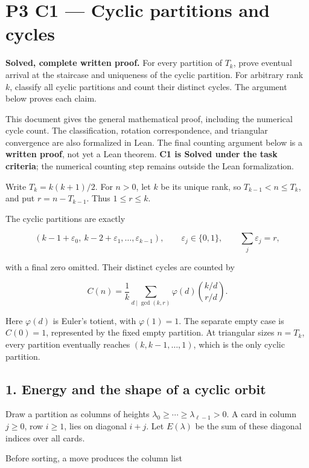 \documentclass[11pt,a4paper]{article}
\begin{document}
\section{P3 C1 --- Cyclic partitions and cycles}\label{p3-c1-cyclic-partitions-and-cycles}

\textbf{Solved, complete written proof.} For every partition of \(T_k\), prove eventual arrival at the staircase and uniqueness of the cyclic partition. For arbitrary rank \(k\), classify all cyclic partitions and count their distinct cycles. The argument below proves each claim.

This document gives the general mathematical proof, including the numerical cycle count. The classification, rotation correspondence, and triangular convergence are also formalized in Lean. The final counting argument below is a \textbf{written proof}, not yet a Lean theorem. \textbf{C1 is Solved under the task criteria}; the numerical counting step remains outside the Lean formalization.

Write \(T_k=k(k+1)/2\). For \(n>0\), let \(k\) be its unique rank, so \(T_{k-1}<n\le T_k\), and put \(r=n-T_{k-1}\). Thus \(1\le r\le k\).

The cyclic partitions are exactly

\[
(k-1+\varepsilon_0,\ k-2+\varepsilon_1,\ldots,\varepsilon_{k-1}),
\qquad \varepsilon_j\in\{0,1\},\qquad \sum_j\varepsilon_j=r,
\]

with a final zero omitted. Their distinct cycles are counted by

\[
\boxed{\displaystyle
C(n)=\frac1k\sum_{d\mid\gcd(k,r)}\varphi(d)
  \binom{k/d}{r/d}.}
\]

Here \(\varphi(d)\) is Euler's totient, with \(\varphi(1)=1\). The separate empty case is \(C(0)=1\), represented by the fixed empty partition. At triangular sizes \(n=T_k\), every partition eventually reaches \((k,k-1,\ldots,1)\), which is the only cyclic partition.

\subsection{1. Energy and the shape of a cyclic orbit}\label{energy-and-the-shape-of-a-cyclic-orbit}

Draw a partition as columns of heights \(\lambda_0\ge\cdots\ge\lambda_{\ell-1}>0\). A card in column \(j\ge0\), row \(i\ge1\), lies on diagonal \(i+j\). Let \(E(\lambda)\) be the sum of these diagonal indices over all cards.

Before sorting, a move produces the column list
\end{document}
